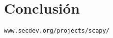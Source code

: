 \section{Conclusión}

 
\begin{thebibliography}{9}
\texttt{www.secdev.org/projects/scapy/}
 

\end{thebibliography}
